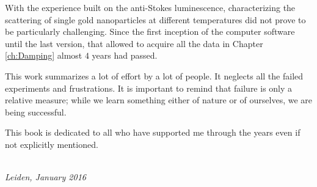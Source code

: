 With the experience built on the anti-Stokes luminescence, characterizing the
scattering of single gold nanoparticles at different temperatures did not prove
to be particularly challenging. Since the first inception of the computer
software until the last version, that allowed to acquire all the data in Chapter
\ref{ch:Damping} almost $4$ years had passed. 

This work summarizes a lot of effort by a lot of people. It neglects all the
failed experiments and frustrations. It is important to remind that failure is
only a relative measure; while we learn something either of nature or of
ourselves, we are being successful. 

This book is dedicated to all who have supported me through the years even if
not explicitly mentioned.

\begin{flushright}
{\makeatletter\itshape
    \@firstname\ \@lastname \\
    Leiden, January 2016
\makeatother}
\end{flushright}

